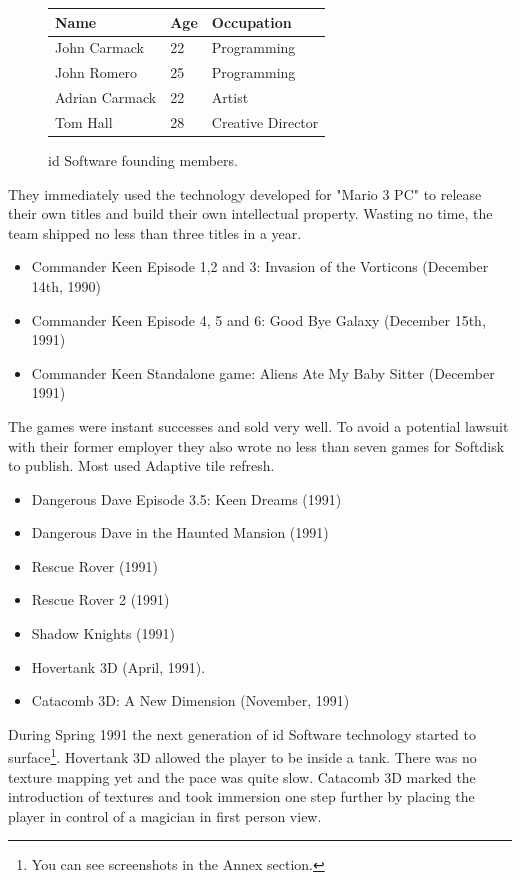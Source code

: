\documentclass[book.tex]{subfiles}
\begin{document}
 \begin{figure}[H]
\centering  
\begin{tabularx}{\textwidth}{ X  X  X  }
  \toprule
  \textbf{Name} &  \textbf{Age} & \textbf{Occupation} \\
  \toprule 
   John Carmack & 22 &  Programming\\
   John Romero & 25 &  Programming\\
   Adrian Carmack & 22 &  Artist\\
   Tom Hall & 28 &  Creative Director\\
     \toprule
\end{tabularx}
\caption{id Software founding members.}\label{fig:Id Software team}
\end{figure}
They immediately used the technology developed for "Mario 3 PC" to release their own titles and build their own intellectual property. Wasting no time, the team shipped no less than three titles in a year.
\begin{itemize}
    \item Commander Keen Episode 1,2 and 3: Invasion of the Vorticons (December 14th, 1990)
    \item Commander Keen Episode 4, 5 and 6: Good Bye Galaxy (December 15th, 1991)
    \item Commander Keen Standalone game: Aliens Ate My Baby Sitter (December 1991)
\end{itemize}
The games were instant successes and sold very well. To avoid a potential lawsuit with their former employer they also wrote no less than seven games for Softdisk to publish. Most used Adaptive tile refresh.
\begin{itemize}
  \item Dangerous Dave Episode 3.5: Keen Dreams (1991)
  \item Dangerous Dave in the Haunted Mansion (1991)
  \item Rescue Rover (1991)
  \item Rescue Rover 2 (1991)
  \item Shadow Knights (1991)
  \item Hovertank 3D (April, 1991).
  \item Catacomb 3D: A New Dimension (November, 1991)
\end{itemize}
During Spring 1991 the next generation of id Software technology started to surface\footnote{You can see screenshots in the Annex section.}. Hovertank 3D allowed the player to be inside a tank. There was no texture mapping yet and the pace was quite slow. Catacomb 3D marked the introduction of textures and took immersion one step further by placing the player in control of a magician in first person view. \\
\par
\end{document}

